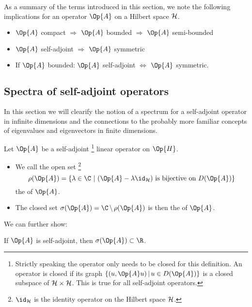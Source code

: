 \begin{rem}
	As a summary of the terms introduced in this section,
	we note the following implications for an operator $\Op{A}$
	on a Hilbert space $\mathcal{H}$.
	\begin{itemize}
		\item $\Op{A}$ compact
			$\Rightarrow$ $\Op{A}$ bounded $\Rightarrow$ $\Op{A}$ semi-bounded
		\item $\Op{A}$ self-adjoint $\Rightarrow$ $\Op{A}$ symmetric
		\item If $\Op{A}$ bounded: $\Op{A}$ self-adjoint $\Leftrightarrow$
			$\Op{A}$ symmetric.
	\end{itemize}
\end{rem}

\subsection{Spectra of self-adjoint operators}
In this section we will clearify the notion of a spectrum
for a self-adjoint operator in infinite dimensions
and the connections to the probably more familiar concepts
of eigenvalues and eigenvectors in finite dimensions.

\newcommand{\shiftop}{(\Op{A} - \lambda \id_{\hilbert})}
\begin{defn}
	\label{defn:Spectrum}
	Let $\Op{A}$ be a self-adjoint%
	\footnote{Strictly speaking the operator only needs to be closed for this definition.
	An operator is closed if its graph $\{ (u, \Op{A}u) \, | \, u \in D(\Op{A}) \}$
	is a closed subspace of $\mathcal{H} \times \mathcal{H}$.
	This is true for all self-adjoint operators.}
	linear operator on $\Op{H}$.
	\begin{itemize}
		\item We call the open set%
			\footnote{$\id_{\hilbert}$ is the identity operator on the Hilbert space $\mathcal{H}$.}
			\[ \rho(\Op{A}) = \left\{ \lambda \in \C \ \middle| \
				\shiftop \
				\text{is bijective on $D(\Op{A})$} \right\} \]
			the  of $\Op{A}$.
		\item The closed set $\sigma(\Op{A}) = \C \, \backslash \, \rho(\Op{A})$
			is then the \newterm{spectrum} of $\Op{A}$.
	\end{itemize}
\end{defn}

\noindent
We can further show:~\cite[p.~102]{Helffer2013}
\begin{prop}
	If $\Op{A}$ is self-adjoint, then $\sigma(\Op{A}) \subset \R$.
\end{prop}

